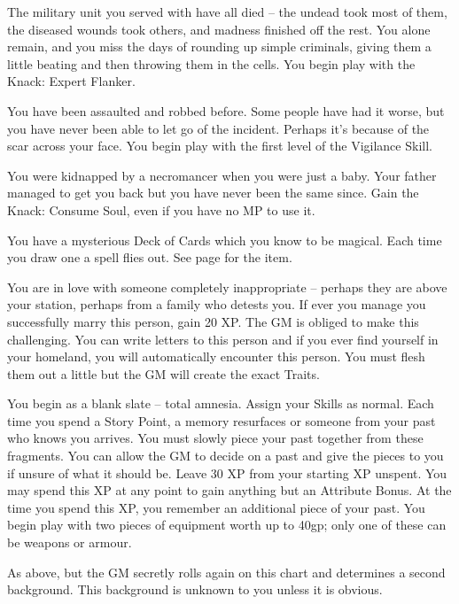 \begin{multicols}{2}
\begin{list}{\addtocounter{list}{1}\textbf{:}}{\raggedleft}
\item{The military unit you served with have all died -- the undead took most of them, the diseased wounds took others, and madness finished off the rest.  You alone remain, and you miss the days of rounding up simple criminals, giving them a little beating and then throwing them in the cells.  You begin play with the Knack: Expert Flanker.}

\item{You have been assaulted and robbed before.  Some people have had it worse, but you have never been able to let go of the incident.  Perhaps it's because of the scar across your face.  You begin play with the first level of the Vigilance Skill.}

\item{You were kidnapped by a necromancer when you were just a baby.  Your father managed to get you back but you have never been the same since.  Gain the Knack: Consume Soul, even if you have no MP to use it.}

\item{You have a mysterious Deck of Cards which you know to be magical.  Each time you draw one a spell flies out.  See page \pageref{deckofmanythings} for the item.}

\item{You are in love with someone completely inappropriate -- perhaps they are above your station, perhaps from a family who detests you.  If ever you manage you successfully marry this person, gain 20 XP.  The GM is obliged to make this challenging.  You can write letters to this person and if you ever find yourself in your homeland, you will automatically encounter this person.  You must flesh them out a little but the GM will create the exact Traits.}

\item{You begin as a blank slate -- total amnesia.  Assign your Skills as normal. Each time you spend a Story Point, a memory resurfaces or someone from your past who knows you arrives.  You must slowly piece your past together from these fragments.  You can allow the GM to decide on a past and give the pieces to you if unsure of what it should be.  Leave 30 XP from your starting XP unspent.  You may spend this XP at any point to gain anything but an Attribute Bonus.  At the time you spend this XP, you remember an additional piece of your past.  You begin play with two pieces of equipment worth up to 40gp; only one of these can be weapons or armour.}

\item{As above, but the GM secretly rolls again on this chart and determines a second background.  This background is unknown to you unless it is obvious.}


\end{list}
\end{multicols}
